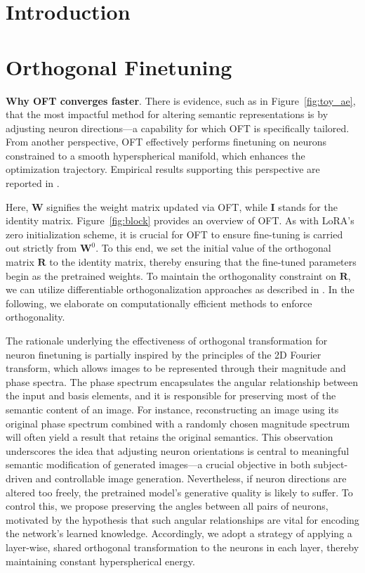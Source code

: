 \section{Introduction}

\section{Orthogonal Finetuning}

\textbf{Why OFT converges faster}. There is evidence, such as in Figure~\ref{fig:toy_ae}, that the most impactful method for altering semantic representations is by adjusting neuron directions—a capability for which OFT is specifically tailored. From another perspective, OFT effectively performs finetuning on neurons constrained to a smooth hyperspherical manifold, which enhances the optimization trajectory. Empirical results supporting this perspective are reported in \cite{liu2021orthogonal}.

Here, $\bm{W}$ signifies the weight matrix updated via OFT, while $\bm{I}$ stands for the identity matrix. Figure~\ref{fig:block} provides an overview of OFT. As with LoRA’s zero initialization scheme, it is crucial for OFT to ensure fine-tuning is carried out strictly from $\bm{W}^0$. To this end, we set the initial value of the orthogonal matrix $\bm{R}$ to the identity matrix, thereby ensuring that the fine-tuned parameters begin as the pretrained weights. To maintain the orthogonality constraint on $\bm{R}$, we can utilize differentiable orthogonalization approaches as described in \cite{liu2021orthogonal,lezcano2019cheap}. In the following, we elaborate on computationally efficient methods to enforce orthogonality.

The rationale underlying the effectiveness of orthogonal transformation for neuron finetuning is partially inspired by the principles of the 2D Fourier transform, which allows images to be represented through their magnitude and phase spectra. The phase spectrum encapsulates the angular relationship between the input and basis elements, and it is responsible for preserving most of the semantic content of an image. For instance, reconstructing an image using its original phase spectrum combined with a randomly chosen magnitude spectrum will often yield a result that retains the original semantics. This observation underscores the idea that adjusting neuron orientations is central to meaningful semantic modification of generated images—a crucial objective in both subject-driven and controllable image generation. Nevertheless, if neuron directions are altered too freely, the pretrained model’s generative quality is likely to suffer. To control this, we propose preserving the angles between all pairs of neurons, motivated by the hypothesis that such angular relationships are vital for encoding the network’s learned knowledge. Accordingly, we adopt a strategy of applying a layer-wise, shared orthogonal transformation to the neurons in each layer, thereby maintaining constant hyperspherical energy.

